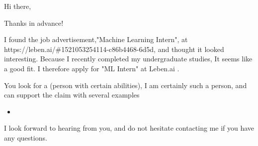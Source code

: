 \documentclass[11pt,a4paper,roman]{moderncv}
\begin{document}
\date{\today}
\opening{Hi there,}
\closing{Thanks in advance!}
\makelettertitle



I found the job advertisement,"Machine Learning Intern", at https://leben.ai/\#1521053254114-c86b4468-6d5d, and thought it looked interesting. Because I recently completed my undergraduate studies, It seems like a good fit. I therefore apply for "ML Intern" at Leben.ai .


You look for a (person with certain abilities), I am certainly such a person, and can support the claim with several examples
\begin{itemize}
\item 
\end{itemize}


I look forward to hearing from you, and do not hesitate contacting me if you have any questions.

\vspace{0.5cm}


\makeletterclosing
\end{document}

